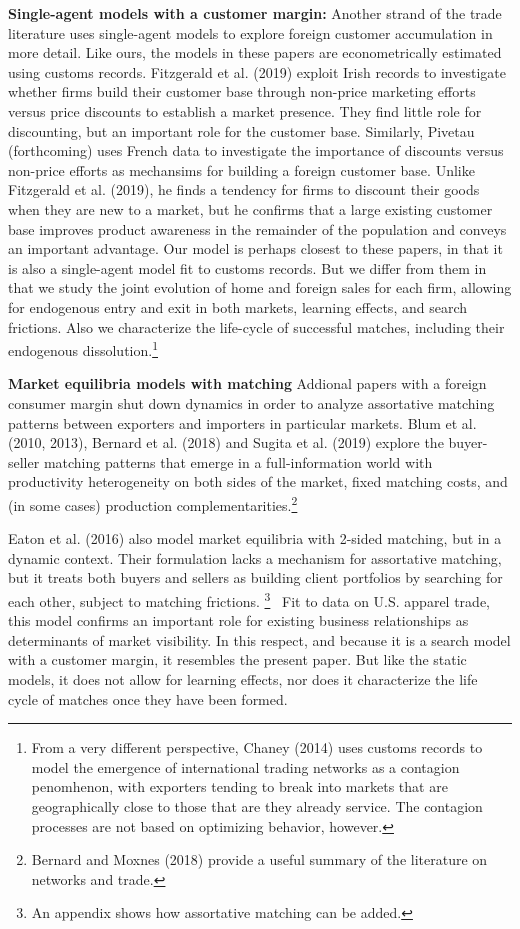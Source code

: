 \documentclass[12pt]{article}
\begin{document}
\textbf{Single-agent models with a customer margin:} Another strand of the
trade literature uses single-agent models to explore foreign customer
accumulation in more detail. Like ours, the models in these papers are
econometrically estimated using customs records. Fitzgerald et al. (2019)
exploit Irish records to investigate whether firms build their customer base
through non-price marketing efforts versus price discounts to establish a
market presence. They find little role for discounting, but an important
role for the customer base. Similarly, Pivetau (forthcoming) uses French
data to investigate the importance of discounts versus non-price efforts as
mechansims for building a foreign customer base. Unlike Fitzgerald et al.
(2019), he finds a tendency for firms to discount their goods when they are
new to a market, but he confirms that a large existing customer base
improves product awareness in the remainder of the population and conveys an
important advantage. Our model is perhaps closest to these papers, in that
it is also a single-agent model fit to customs records. But we differ from
them in that we study the joint evolution of home and foreign sales for each
firm, allowing for endogenous entry and exit in both markets, learning
effects, and search frictions. Also we characterize the life-cycle of
successful matches, including their endogenous dissolution.\footnote{%
From a very different perspective, Chaney (2014) uses customs records to
model the emergence of international trading networks as a contagion
penomhenon, with exporters tending to break into markets that are
geographically close to those that are they already service. The contagion
processes are not based on optimizing behavior, however.}

\textbf{Market equilibria models with matching }Addional papers with a
foreign consumer margin shut down dynamics in order to analyze assortative
matching patterns between exporters and importers in particular markets.
Blum et al. (2010, 2013), Bernard et al. (2018) and Sugita et al. (2019)
explore the buyer-seller matching patterns that emerge in a full-information
world with productivity heterogeneity on both sides of the market, fixed
matching costs, and (in some cases) production complementarities.\footnote{%
Bernard and Moxnes (2018) provide a useful summary of the literature on
networks and trade.}

Eaton et al. (2016) also model market equilibria with 2-sided matching, but
in a dynamic context. Their formulation lacks a mechanism for assortative
matching, but it treats both buyers and sellers as building client
portfolios by searching for each other, subject to matching frictions.%
\footnote{%
An appendix shows how assortative matching can be added.} \ Fit to data on
U.S. apparel trade, this model confirms an important role for existing
business relationships as determinants of market visibility. In this
respect, and because it is a search model with a customer margin, it
resembles the present paper. But like the static models, it does not allow
for learning effects, nor does it characterize the life cycle of matches
once they have been formed.
\end{document}

